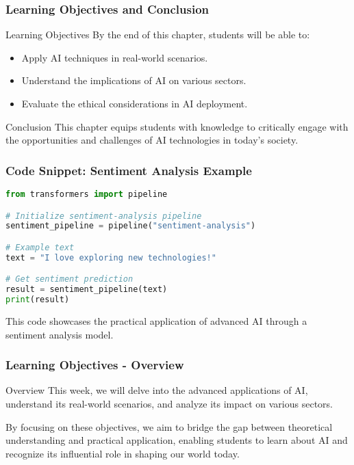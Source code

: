 \documentclass[aspectratio=169]{beamer}
\begin{document}
\begin{frame}[fragile]
    \frametitle{Learning Objectives and Conclusion}
    \begin{block}{Learning Objectives}
        By the end of this chapter, students will be able to:
        \begin{itemize}
            \item Apply AI techniques in real-world scenarios.
            \item Understand the implications of AI on various sectors.
            \item Evaluate the ethical considerations in AI deployment.
        \end{itemize}
    \end{block}

    \begin{block}{Conclusion}
        This chapter equips students with knowledge to critically engage with the opportunities and challenges of AI technologies in today's society.
    \end{block}
\end{frame}

\begin{frame}[fragile]
    \frametitle{Code Snippet: Sentiment Analysis Example}
    \begin{lstlisting}[language=Python]
from transformers import pipeline

# Initialize sentiment-analysis pipeline
sentiment_pipeline = pipeline("sentiment-analysis")

# Example text
text = "I love exploring new technologies!"

# Get sentiment prediction
result = sentiment_pipeline(text)
print(result)
    \end{lstlisting}
    This code showcases the practical application of advanced AI through a sentiment analysis model.
\end{frame}

\begin{frame}[fragile]
    \frametitle{Learning Objectives - Overview}
    \begin{block}{Overview}
        This week, we will delve into the advanced applications of AI, understand its real-world scenarios, and analyze its impact on various sectors. 
    \end{block}
    By focusing on these objectives, we aim to bridge the gap between theoretical understanding and practical application, enabling students to learn about AI and recognize its influential role in shaping our world today.
\end{frame}
\end{document}
